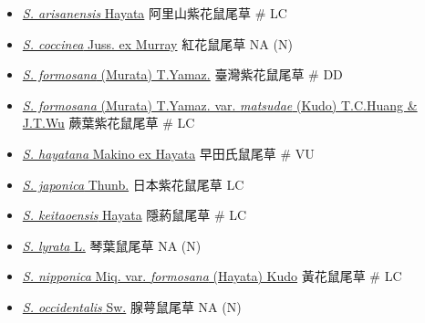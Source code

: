 \begin{itemize}
  \begin{itemize}
        \item[] \href{http://www.theplantlist.org/tpl1.1/search?q=Salvia+arisanensis}{\textit{S. arisanensis} Hayata}   阿里山紫花鼠尾草  \# LC
        \item[] \href{http://www.theplantlist.org/tpl1.1/search?q=Salvia+coccinea}{\textit{S. coccinea} Juss. ex Murray}   紅花鼠尾草   NA (N)
        \item[] \href{http://www.theplantlist.org/tpl1.1/search?q=Salvia+formosana}{\textit{S. formosana} (Murata) T.Yamaz.}   臺灣紫花鼠尾草  \# DD
        \item[] \href{http://www.theplantlist.org/tpl1.1/search?q=Salvia+formosana+var.+matsudae}{\textit{S. formosana} (Murata) T.Yamaz. var. \textit{matsudae} (Kudo) T.C.Huang \& J.T.Wu}   蕨葉紫花鼠尾草  \# LC
        \item[] \href{http://www.theplantlist.org/tpl1.1/search?q=Salvia+hayatana}{\textit{S. hayatana} Makino ex Hayata}   早田氏鼠尾草  \# VU
        \item[] \href{http://www.theplantlist.org/tpl1.1/search?q=Salvia+japonica}{\textit{S. japonica} Thunb.}   日本紫花鼠尾草   LC
        \item[] \href{http://www.theplantlist.org/tpl1.1/search?q=Salvia+keitaoensis}{\textit{S. keitaoensis} Hayata}   隱葯鼠尾草  \# LC
        \item[] \href{http://www.theplantlist.org/tpl1.1/search?q=Salvia+lyrata}{\textit{S. lyrata} L.}   琴葉鼠尾草   NA (N)
        \item[] \href{http://www.theplantlist.org/tpl1.1/search?q=Salvia+nipponica+var.+formosana}{\textit{S. nipponica} Miq. var. \textit{formosana} (Hayata) Kudo}   黃花鼠尾草  \# LC
        \item[] \href{http://www.theplantlist.org/tpl1.1/search?q=Salvia+occidentalis}{\textit{S. occidentalis} Sw.}   腺萼鼠尾草   NA (N)

\end{itemize}
\end{itemize}

